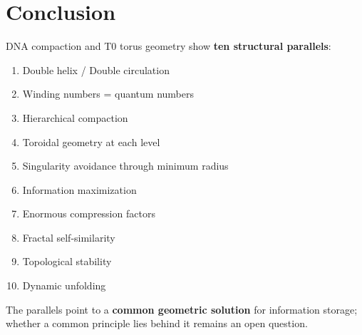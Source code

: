 	\begin{table}[H]
		\centering
		\small
		\caption{Scale comparison (qualitative)}
	\end{table}

	\section{Conclusion}

	\begin{keyresult}
		DNA compaction and T0 torus geometry show \textbf{ten structural parallels}:

		\vspace{0.3cm}

		\begin{enumerate}
			\item Double helix / Double circulation
			\item Winding numbers = quantum numbers
			\item Hierarchical compaction
			\item Toroidal geometry at each level
			\item Singularity avoidance through minimum radius
			\item Information maximization
			\item Enormous compression factors
			\item Fractal self-similarity
			\item Topological stability
			\item Dynamic unfolding
		\end{enumerate}

		\vspace{0.3cm}

		The parallels point to a \textbf{common geometric solution} for information storage; whether a common principle lies behind it remains an open question.
	\end{keyresult}

